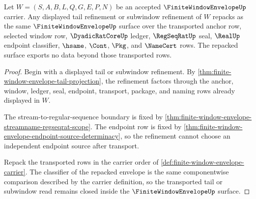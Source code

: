 \begin{theorem}
\label{thm:finite-window-envelope-subwindow-refinement-closure}
Let $W=(S,A,B,L,Q,G,E,P,N)$ be an accepted $\FiniteWindowEnvelopeUp$ carrier. Any displayed tail refinement or subwindow refinement of $W$ repacks as the same $\FiniteWindowEnvelopeUp$ surface over the transported anchor row, selected window row, $\DyadicRatCoreUp$ ledger, $\RegSeqRatUp$ seal, $\RealUp$ endpoint classifier, $\hsame$, $\Cont$, $\Pkg$, and $\NameCert$ rows. The repacked surface exports no data beyond those transported rows.
\end{theorem}
\begin{proof}
Begin with a displayed tail or subwindow refinement. By \autoref{thm:finite-window-envelope-tail-projection}, the refinement factors through the anchor, window, ledger, seal, endpoint, transport, package, and naming rows already displayed in $W$.

The stream-to-regular-sequence boundary is fixed by \autoref{thm:finite-window-envelope-streamname-regseqrat-scope}. The endpoint row is fixed by \autoref{thm:finite-window-envelope-endpoint-source-determinacy}, so the refinement cannot choose an independent endpoint source after transport.

Repack the transported rows in the carrier order of \autoref{def:finite-window-envelope-carrier}. The classifier of the repacked envelope is the same componentwise comparison described by the carrier definition, so the transported tail or subwindow read remains closed inside the $\FiniteWindowEnvelopeUp$ surface.
\end{proof}


